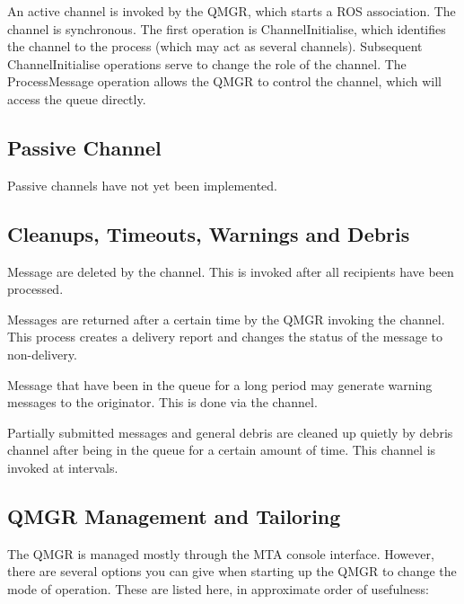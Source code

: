 An active channel is invoked by the QMGR, which starts a ROS
association.  The channel is synchronous. The first operation is
ChannelInitialise, which identifies the channel to the process (which
may act as several channels).  Subsequent ChannelInitialise operations
serve to change the role of the channel.  The ProcessMessage operation
allows the QMGR to control the channel, which will access the queue
directly.

\subsection{Passive Channel}

Passive channels have not yet been implemented.

\subsection{Cleanups, Timeouts, Warnings and Debris}

Message are deleted by the  channel. This is invoked
after all recipients have been processed.

Messages are returned after a certain time by the QMGR invoking
the  channel. This process creates a delivery report and
changes the status of the message to non-delivery.

Message that have been in the queue for a long period may generate
warning messages to the originator. This is done via the 
channel.

Partially submitted messages and general debris are cleaned up quietly
by debris channel after being in the queue for a certain amount of
time. This channel is invoked at intervals.

\subsection{QMGR Management and Tailoring}\label{sect:qmgrmgr}

The QMGR is managed mostly through the MTA console interface.
However, there are several options you can give when starting up the
QMGR to change the mode of operation. These are listed here, in
approximate order of usefulness:

